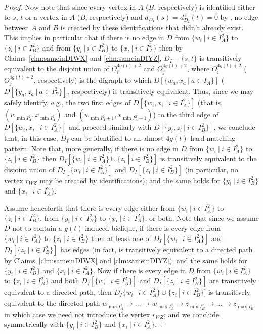 \documentclass[a4paper,11pt]{article}
\theoremstyle{plain}
\newtheorem{identification rule}{Identification Rule}
\theoremstyle{definition}
\theoremstyle{remark}
\begin{document}
\begin{proof}
Now note that since every vertex in $A$ ($B$, respectively) is identified either to $s$, $t$ or a vertex in $A$ ($B$, respectively) and $d^-_{D_I}(s) = d^+_{D_I}(t) = 0$ by , 
no edge between $A$ and $B$ is created by these identifications that didn't already exist.
This implies in particular that if there is no edge in $D$ from $\{w_i~|~i \in I_A^2\}$ to $\{z_i~|~i \in I_B^2\}$ 
and from $\{y_i~|~i\in I_B^2\}$ to $\{x_i~|~i \in I_A^2\}$ then by Claims~\ref{clm:sameinDIWX} and \ref{clm:sameinDIYZ}, $D_I - \{s,t\}$ is transitively equivalent to the disjoint union of $O_i^{4g(t)+2}$ and $O_j^{4g(t)+2}$, 
where $O_i^{4g(t)+2}$ ($O_j^{4g(t)+2}$, respectively) is the digraph to which $D[\{w_a,x_a~|~a \in I_A\}]$ ($D[\{y_a,z_a~|~a \in I_B^2\}]$, respectively) is transitively equivalent.
Thus, since we may safely identify, e.g., the two first edges of $D[\{w_i,x_i~|~i \in I_A^2\}]$ 
(that is, $(w_{\min I_A^2},x_{\min I_A^2})$ and $(w_{\min I_A^2+1},x_{\min I_A^2+1})$) to the third edge of
$D[\{w_i,x_i~|~i \in I_A^2\}]$ and proceed similarly with $D[\{y_i,z_i~|~i \in I_B^2\}]$,
we conclude that, in this case, $D_I$ can be identified to an almost $4g(t)$-hard matching pattern.
Note that, more generally, if there is no edge in $D$ from $\{w_i~|~i \in I_A^2\}$ to $\{z_i~|~i \in I_B^2\}$
then $D_I[\{w_i~|~i \in I_A^2\} \cup \{z_i~|~i \in I_B^2\}]$ is transitively equivalent to the disjoint union of $D_I[\{w_i~|~i \in I_A^2\}]$ and $D_I[\{z_i~|~i \in I_B^2\}]$ (in particular, no vertex $r_{WZ}$ may be created by identifications); 
and the same holds for $\{y_i~|~i\in I_B^2\}$ and $\{x_i~|~i \in I_A^2\}$.

Assume henceforth that there is every edge either from $\{w_i~|~i \in I_A^2\}$ to $\{z_i~|~i \in I_B^2\}$,
from $\{y_i~|~i\in I_B^2\}$ to $\{x_i~|~i \in I_A^2\}$, or both.
Note that since we assume $D$ not to contain a $g(t)$-induced-biclique,
if there is every edge from $\{w_i~|~i \in I_A^2\}$ to $\{z_i~|~i \in I_B^2\}$
then at least one of $D_I[\{w_i~|~i \in I_A^2\}]$ and $D_I[\{z_i~|~i \in I_B^2\}]$ has edges 
(in fact, is transitively equivalent to a directed path by Claims~\ref{clm:sameinDIWX} and \ref{clm:sameinDIYZ});
and the same holds for $\{y_i~|~i\in I_B^2\}$ and $\{x_i~|~i \in I_A^2\}$.
Now if there is every edge in $D$ from $\{w_i~|~i \in I_A^2\}$ to $\{z_i~|~i \in I_B^2\}$
and both $D_I[\{w_i~|~i \in I_A^2\}]$ and $D_I[\{z_i~|~i \in I_B^2\}]$ are transitively equivalent to a directed path,
then $D_I\{w_i~|~i \in I_A^2\} \cup \{z_i~|~i \in I_B^2\}]$ is transitively equivalent to the directed path
$w_{\min I_A^2} \rightarrow \ldots \rightarrow w_{\max I_A^2} \rightarrow z_{\min I_B^2} \rightarrow \ldots \rightarrow z_{\max I_B^2}$ in which case we need not introduce the vertex $r_{WZ}$;
and we conclude symmetrically with $\{y_i~|~i\in I_B^2\}$ and $\{x_i~|~i \in I_A^2\}$.
 

\end{proof}
\end{document}
